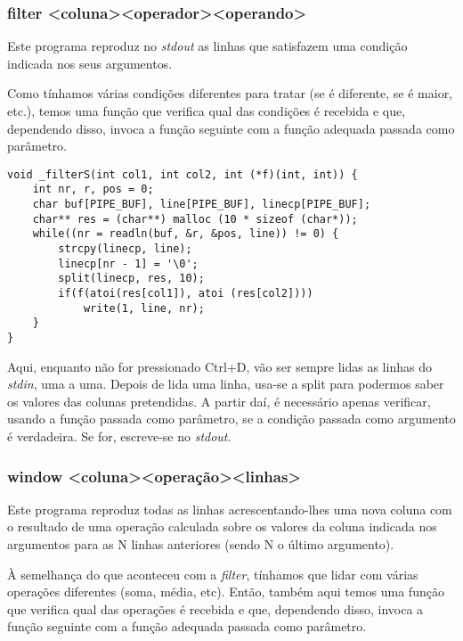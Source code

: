\documentclass[a4paper]{article}
\begin{document}
\subsubsection{filter \textless coluna\textgreater \textless operador\textgreater \textless operando\textgreater}

Este programa reproduz no \textit{stdout} as linhas que satisfazem uma condição indicada nos seus argumentos.

Como tínhamos várias condições diferentes para tratar (se é diferente, se é maior, etc.), temos uma função que verifica qual das condições é recebida e que, dependendo disso, invoca a função seguinte com a função adequada passada como parâmetro.

\begin{Verbatim}[obeytabs]
void _filterS(int col1, int col2, int (*f)(int, int)) {
	int nr, r, pos = 0;
	char buf[PIPE_BUF], line[PIPE_BUF], linecp[PIPE_BUF];
	char** res = (char**) malloc (10 * sizeof (char*));
	while((nr = readln(buf, &r, &pos, line)) != 0) {
		strcpy(linecp, line);
		linecp[nr - 1] = '\0';
		split(linecp, res, 10);
		if(f(atoi(res[col1]), atoi (res[col2])))
			write(1, line, nr);
	}
}
\end{Verbatim}

Aqui, enquanto não for pressionado Ctrl+D, vão ser sempre lidas as linhas do \textit{stdin}, uma a uma. Depois de lida uma linha, usa-se a split para podermos saber os valores das colunas pretendidas. A partir daí, é necessário apenas verificar, usando a função passada como parâmetro, se a condição passada como argumento é verdadeira. Se for, escreve-se no \textit{stdout}.

\subsubsection{window \textless coluna\textgreater \textless operação\textgreater \textless linhas\textgreater}

Este programa reproduz todas as linhas acrescentando-lhes uma nova coluna com o resultado de uma operação calculada sobre os valores da coluna indicada nos argumentos para as N linhas anteriores (sendo N o último argumento).

À semelhança do que aconteceu com a \textit{filter}, tínhamos que lidar com várias operações diferentes (soma, média, etc). Então, também aqui temos uma função que verifica qual das operações é recebida e que, dependendo disso, invoca a função seguinte com a função adequada passada como parâmetro.
\end{document}
